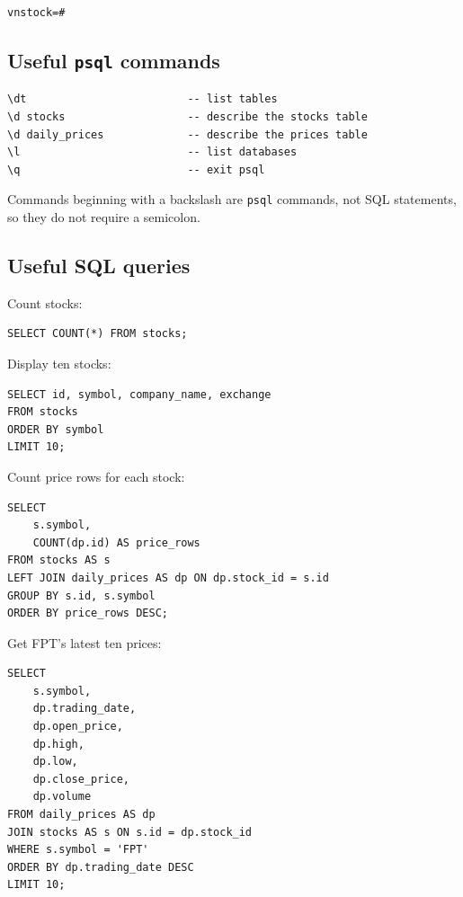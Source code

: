 \documentclass[11pt,a4paper]{article}
\begin{document}
\begin{lstlisting}[style=terminal]
vnstock=#
\end{lstlisting}

\subsection{Useful \texttt{psql} commands}

\begin{lstlisting}[style=terminal]
\dt                         -- list tables
\d stocks                   -- describe the stocks table
\d daily_prices             -- describe the prices table
\l                          -- list databases
\q                          -- exit psql
\end{lstlisting}

Commands beginning with a backslash are \texttt{psql} commands, not SQL
statements, so they do not require a semicolon.

\subsection{Useful SQL queries}

Count stocks:

\begin{lstlisting}[style=sql]
SELECT COUNT(*) FROM stocks;
\end{lstlisting}

Display ten stocks:

\begin{lstlisting}[style=sql]
SELECT id, symbol, company_name, exchange
FROM stocks
ORDER BY symbol
LIMIT 10;
\end{lstlisting}

Count price rows for each stock:

\begin{lstlisting}[style=sql]
SELECT
    s.symbol,
    COUNT(dp.id) AS price_rows
FROM stocks AS s
LEFT JOIN daily_prices AS dp ON dp.stock_id = s.id
GROUP BY s.id, s.symbol
ORDER BY price_rows DESC;
\end{lstlisting}

Get FPT's latest ten prices:

\begin{lstlisting}[style=sql]
SELECT
    s.symbol,
    dp.trading_date,
    dp.open_price,
    dp.high,
    dp.low,
    dp.close_price,
    dp.volume
FROM daily_prices AS dp
JOIN stocks AS s ON s.id = dp.stock_id
WHERE s.symbol = 'FPT'
ORDER BY dp.trading_date DESC
LIMIT 10;
\end{lstlisting}
\end{document}
